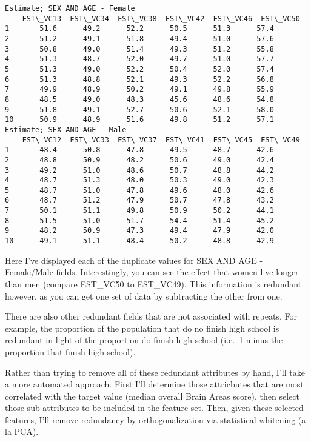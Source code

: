 \documentclass{article}
\begin{document}
    \begin{Verbatim}[commandchars=\\\{\}]
Estimate; SEX AND AGE - Female
    EST\_VC13  EST\_VC34  EST\_VC38  EST\_VC42  EST\_VC46  EST\_VC50
1       51.6      49.2      52.2      50.5      51.3      57.4
2       51.2      49.1      51.8      49.4      51.0      57.6
3       50.8      49.0      51.4      49.3      51.2      55.8
4       51.3      48.7      52.0      49.7      51.0      57.7
5       51.3      49.0      52.2      50.4      52.0      57.4
6       51.3      48.8      52.1      49.3      52.2      56.8
7       49.9      48.9      50.2      49.1      49.8      55.9
8       48.5      49.0      48.3      45.6      48.6      54.8
9       51.8      49.1      52.7      50.6      52.1      58.0
10      50.9      48.9      51.6      49.8      51.2      57.1
Estimate; SEX AND AGE - Male
    EST\_VC12  EST\_VC33  EST\_VC37  EST\_VC41  EST\_VC45  EST\_VC49
1       48.4      50.8      47.8      49.5      48.7      42.6
2       48.8      50.9      48.2      50.6      49.0      42.4
3       49.2      51.0      48.6      50.7      48.8      44.2
4       48.7      51.3      48.0      50.3      49.0      42.3
5       48.7      51.0      47.8      49.6      48.0      42.6
6       48.7      51.2      47.9      50.7      47.8      43.2
7       50.1      51.1      49.8      50.9      50.2      44.1
8       51.5      51.0      51.7      54.4      51.4      45.2
9       48.2      50.9      47.3      49.4      47.9      42.0
10      49.1      51.1      48.4      50.2      48.8      42.9
    \end{Verbatim}

    Here I've displayed each of the duplicate values for SEX AND AGE -
Female/Male fields. Interestingly, you can see the effect that women
live longer than men (compare EST\_VC50 to EST\_VC49). This information
is redundant however, as you can get one set of data by subtracting the
other from one.

    There are also other redundant fields that are not associated with
repeats. For example, the proportion of the population that do no finish
high school is redundant in light of the proportion do finish high
school (i.e.~1 minus the proportion that finish high school).

Rather than trying to remove all of these redundant attributes by hand,
I'll take a more automated approach. First I'll determine those
attricbutes that are most correlated with the target value (median
overall Brain Areas score), then select those sub attributes to be
included in the feature set. Then, given these selected features, I'll
remove redundancy by orthogonalization via statistical whitening (a la
PCA).
\end{document}
